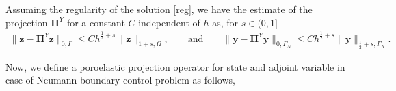 \documentclass[smallextended]{svjour3}
\numberwithin{equation}{section}
\numberwithin{figure}{section}
\numberwithin{table}{section}
\newcommand\bPi{\boldsymbol{\Pi}}
\newcommand\by{\boldsymbol{y}}
\newcommand\bz{\boldsymbol{z}}
\begin{document}
    \begin{lemma}
        Assuming the regularity of the solution \eqref{reg}, we have the estimate of the projection $\bPi^{Y}$ for a constant $C$ independent of $h$ as, for $s \in (0,1]$
        \begin{align*}
            \| \bz - \bPi^{Y} \bz \|_{0, \Gamma} \le C h^{\frac{1}{2} + s} \| \bz \|_{1+s, \Omega}, \qquad \text{and} \qquad 
            \| \by - \bPi^{Y} \by \|_{0, \Gamma_N} \le C h^{\frac{1}{2} + s} \| \by \|_{\frac{1}{2} + s, \Gamma_N}.
        \end{align*}
    \end{lemma}
    \noindent Now, we define a poroelastic projection operator for state and adjoint variable in case of Neumann boundary control problem as follows,
\end{document}
